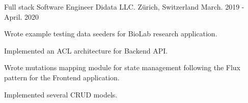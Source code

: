 \begin{cventries}
  \cventry
    {Full stack Software Engineer} %
    {Didata LLC.} %
    {Zürich, Switzerland} %
    {March. 2019 - April. 2020} %
    {
      \begin{cvitems} %
        \item {Wrote example testing data seeders for BioLab research application.}
        \item {Implemented an ACL architecture for Backend API.}
        \item {Wrote mutations mapping module for state management following the Flux pattern for the Frontend application.}
        \item {Implemented several CRUD models.}
      \end{cvitems}
    }

\end{cventries}
